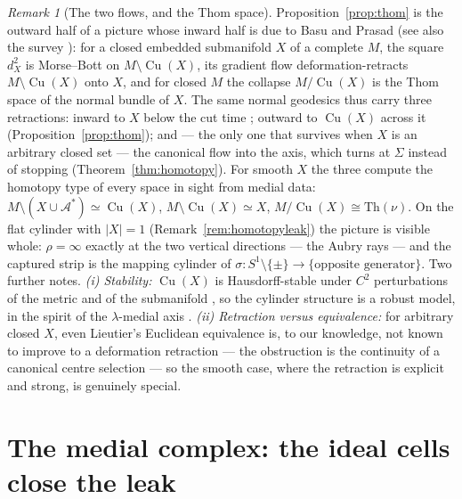 \documentclass[11pt]{article}
\theoremstyle{remark}
\newtheorem{remark}[theorem]{Remark}
\newcommand{\X}{X}
\newcommand{\dX}{d_{\X}}
\newcommand{\Aub}{\mathcal{A}^{\ast}}
\newcommand{\Cu}{\operatorname{Cu}}
\begin{document}
\begin{remark}[The two flows, and the Thom space]\label{rem:bp}
Proposition~\ref{prop:thom} is the outward half of a picture whose
inward half is due to Basu and Prasad \cite{BP} (see also the
survey \cite{Pra}): for a closed embedded submanifold $\X$ of a
complete $M$, the square $\dX^{2}$ is Morse--Bott on
$M\setminus\Cu(\X)$, its gradient flow deformation-retracts
$M\setminus\Cu(\X)$ onto $\X$, and for closed $M$ the collapse
$M/\Cu(\X)$ is the Thom space of the normal bundle of $\X$. The
same normal geodesics thus carry three retractions: inward to
$\X$ below the cut time \cite{BP}; outward to $\Cu(\X)$ across it
(Proposition~\ref{prop:thom}); and --- the only one that survives
when $\X$ is an arbitrary closed set --- the canonical flow into
the axis, which turns at $\Sigma$ instead of stopping
(Theorem~\ref{thm:homotopy}). For smooth $\X$ the three compute
the homotopy type of every space in sight from medial data:
$M\setminus(\X\cup\Aub)\simeq\Cu(\X)$,
$M\setminus\Cu(\X)\simeq\X$, $M/\Cu(\X)\cong\mathrm{Th}(\nu)$. On
the flat cylinder with $|\X|=1$ (Remark~\ref{rem:homotopyleak})
the picture is visible whole: $\rho=\infty$ exactly at the two
vertical directions --- the Aubry rays --- and the captured strip
is the mapping cylinder of
$\sigma:S^{1}\setminus\{\pm\}\to\{\text{opposite generator}\}$.
Two further notes. \emph{(i) Stability:} $\Cu(\X)$ is
Hausdorff-stable under $C^{2}$ perturbations of the metric and of
the submanifold \cite{Bh}, so the cylinder structure is a robust
model, in the spirit of the $\lambda$-medial axis \cite{CL}.
\emph{(ii) Retraction versus equivalence:} for arbitrary closed
$\X$, even Lieutier's Euclidean equivalence \cite{Lie} is, to our
knowledge, not known to improve to a deformation retraction ---
the obstruction is the continuity of a canonical centre selection
--- so the smooth case, where the retraction is explicit and
strong, is genuinely special.
\end{remark}

\section{The medial complex: the ideal cells close the leak}
\label{sec:complex}
\end{document}
